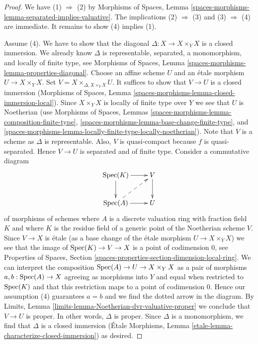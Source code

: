 \begin{proof}
We have (1) $\Rightarrow$ (2) by
Morphisms of Spaces, Lemma
\ref{spaces-morphisms-lemma-separated-implies-valuative}.
The implications (2) $\Rightarrow$ (3) and (3) $\Rightarrow$ (4)
are immediate. It remains to show (4) implies (1).

\medskip\noindent
Assume (4). We have to show that the diagonal
$\Delta : X \to X \times_Y X$ is a closed
immersion. We already know $\Delta$ is representable, separated,
a monomorphism, and locally of finite type, see Morphisms of Spaces, Lemma
\ref{spaces-morphisms-lemma-properties-diagonal}.
Choose an affine scheme $U$ and an \'etale morphism
$U \to X \times_Y X$. Set $V = X \times_{\Delta, X \times_Y X} U$.
It suffices to show that $V \to U$ is a closed immersion
(Morphisms of Spaces, Lemma
\ref{spaces-morphisms-lemma-closed-immersion-local}).
Since $X \times_Y X$ is locally of finite type over $Y$ we see that
$U$ is Noetherian (use Morphisms of Spaces, Lemmas
\ref{spaces-morphisms-lemma-composition-finite-type},
\ref{spaces-morphisms-lemma-base-change-finite-type}, and
\ref{spaces-morphisms-lemma-locally-finite-type-locally-noetherian}).
Note that $V$ is a scheme as $\Delta$ is representable.
Also, $V$ is quasi-compact because $f$ is quasi-separated.
Hence $V \to U$ is separated and of finite type. Consider a commutative diagram
$$
\xymatrix{
\Spec(K) \ar[r] \ar[d] & V \ar[d] \\
\Spec(A) \ar[r] \ar@{-->}[ru] & U
}
$$
of morphisms of schemes where $A$ is a discrete valuation ring
with fraction field $K$ and where $K$ is the residue field of
a generic point of the Noetherian scheme $V$. Since $V \to X$
is \'etale (as a base change of the \'etale morphism $U \to X \times_Y X$)
we see that the image of $\mathop{\mathrm{Spec}}(K) \to V \to X$ is a point of
codimension $0$, see Properties of Spaces, Section
\ref{spaces-properties-section-dimension-local-ring}.
We can interpret the composition $\mathop{\mathrm{Spec}}(A) \to U \to X \times_Y X$
as a pair of morphisms $a, b : \mathop{\mathrm{Spec}}(A) \to X$ agreeing as morphisms
into $Y$ and equal when restricted to $\mathop{\mathrm{Spec}}(K)$ and that this
restriction maps to a point of codimension $0$. Hence our assumption
(4) guarantees $a = b$ and we find the dotted arrow in the diagram.
By Limits, Lemma \ref{limits-lemma-Noetherian-dvr-valuative-proper}
we conclude that $V \to U$ is proper. In other words, $\Delta$ is proper.
Since $\Delta$ is a monomorphism, we find that $\Delta$ is a
closed immersion (\'Etale Morphisms, Lemma
\ref{etale-lemma-characterize-closed-immersion}) as desired.
\end{proof}

